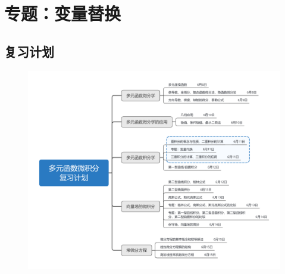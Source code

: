 \documentclass[12pt,UTF8]{ctexart}
\begin{document}
\setcounter{section}{6}
\section{专题：变量替换}
\noindent
\subsection{复习计划}
\begin{figure}[H]
\begin{center}
\includegraphics[height=0.5\textheight]{Figures20190611/plan.png}
\end{center}
\end{figure}
\end{document}
